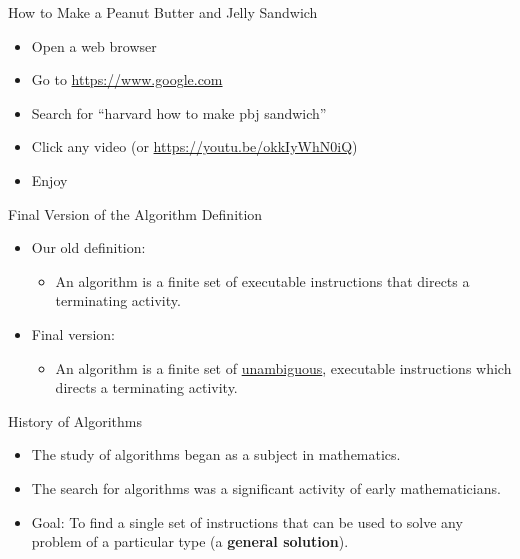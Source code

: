 \documentclass[graphics]{beamer}
\begin{document}
\begin{frame}{How to Make a Peanut Butter and Jelly Sandwich}
    \begin{itemize}
        \item Open a web browser
        \item Go to \url{https://www.google.com}
        \item Search for ``harvard how to make pbj sandwich''
        \item Click any video (or \url{https://youtu.be/okkIyWhN0iQ})
        \item Enjoy
    \end{itemize}
\end{frame}

\begin{frame}{Final Version of the Algorithm Definition}
    \begin{itemize}
        \item Our old definition:
        \begin{itemize}
            \item An algorithm is a finite set of executable instructions that directs a terminating activity.
        \end{itemize}
        \item Final version:
        \begin{itemize}
            \item An algorithm is a finite set of \underline{unambiguous}, executable instructions which directs a terminating activity.
        \end{itemize}
    \end{itemize}
\end{frame}

\begin{frame}{History of Algorithms}
    \begin{itemize}
        \item The study of algorithms began as a subject in mathematics.
        \item The search for algorithms was a significant activity of early mathematicians.
        \item Goal: To find a single set of instructions that can be used to solve any problem of a particular type (a \textbf{general solution}).
    \end{itemize}
\end{frame}
\end{document}
